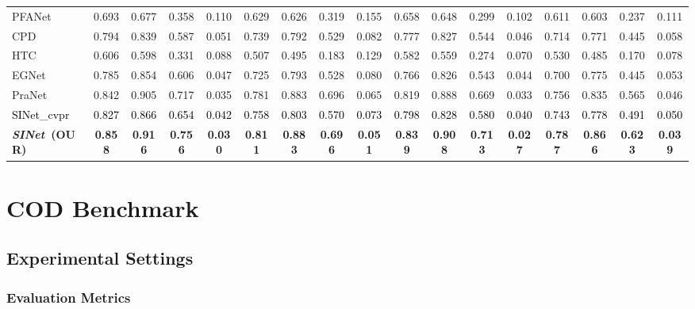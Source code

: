 \documentclass[10pt,journal,compsoc]{IEEEtran}
\newcommand{\Rev}[1]{\textcolor{black}{#1}}
\def\ournewmodel{\emph{SINet}}
\begin{document}
\begin{table*}[t!]
\begin{tabular}{l|cccc||cccc||cccc||cccc}
    PFANet~\cite{zhao2019pyramid} 
    & 0.693 & 0.677 & 0.358 & 0.110 & 0.629 & 0.626 & 0.319 & 0.155 
    & 0.658 & 0.648 & 0.299 & 0.102 & 0.611 & 0.603 & 0.237 & 0.111\\
    CPD~\cite{wu2019cascaded} 
    & 0.794 & 0.839 & 0.587 & 0.051 & 0.739 & 0.792 & 0.529 & 0.082 
    & 0.777 & 0.827 & 0.544 & 0.046 & 0.714 & 0.771 & 0.445 & 0.058\\
    HTC~\cite{chen2019hybrid} 
    & 0.606 & 0.598 & 0.331 & 0.088 & 0.507 & 0.495 & 0.183 & 0.129 
    & 0.582 & 0.559 & 0.274 & 0.070 & 0.530 & 0.485 & 0.170 & 0.078\\
    EGNet~\cite{zhao2019EGNet} 
    & 0.785 & 0.854 & 0.606 & 0.047 & 0.725 & 0.793 & 0.528 & 0.080 
    & 0.766 & 0.826 & 0.543 & 0.044 & 0.700 & 0.775 & 0.445 & 0.053\\
    PraNet~\cite{fan2020pranet} 
    & 0.842 & 0.905 & 0.717 & 0.035 & 0.781 & 0.883 & 0.696 & 0.065 
    & 0.819 & 0.888 & 0.669 & 0.033 & 0.756 & 0.835 & 0.565 & 0.046\\
    \hline
    \Rev{SINet\_cvpr~\cite{fan2020camouflaged}}     
    & \Rev{0.827} & \Rev{0.866} & \Rev{0.654} & \Rev{0.042} & \Rev{0.758} & \Rev{0.803} & \Rev{0.570} & \Rev{0.073} & \Rev{0.798} & \Rev{0.828} & \Rev{0.580} & \Rev{0.040} & \Rev{0.743} & \Rev{0.778} & \Rev{0.491} & \Rev{0.050} \\
    \rowcolor{mygray}
    \textbf{\ournewmodel~(OUR)} 
    & \textbf{0.858} & \textbf{0.916} & \textbf{0.756} & \textbf{0.030} 
    & \textbf{0.811} & \textbf{0.883} & \textbf{0.696} & \textbf{0.051} 
    & \textbf{0.839} & \textbf{0.908} & \textbf{0.713} & \textbf{0.027} 
    & \textbf{0.787} & \textbf{0.866} & \textbf{0.623} & \textbf{0.039}
    \\ \bottomrule
  \end{tabular}
\end{table*}


\section{COD Benchmark}\label{sec:benchmark}

\subsection{Experimental Settings}\label{sec:benchmarkSetup}

\subsubsection{Evaluation Metrics}
\end{document}
